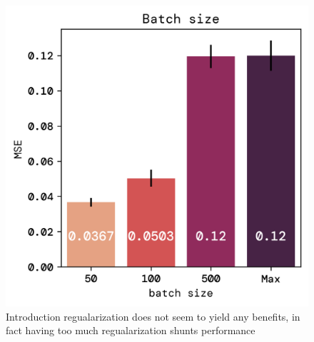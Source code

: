 \documentclass[twoside,11pt]{report}
\begin{document}
\begin{figure}[!ht]
\begin{minipage}[t]{0.5\textwidth - 1mm}
\begin{center}
                \includegraphics[width=\textwidth]{../runsAndFigures/MSE_batch.png}
            \end{center}
            \caption{Introduction regualarization does not seem to yield any benefits, in fact
            having too much regualarization shunts performance}\label{fig:MSE_batch}
        \end{minipage}
    \end{figure}
\end{document}
